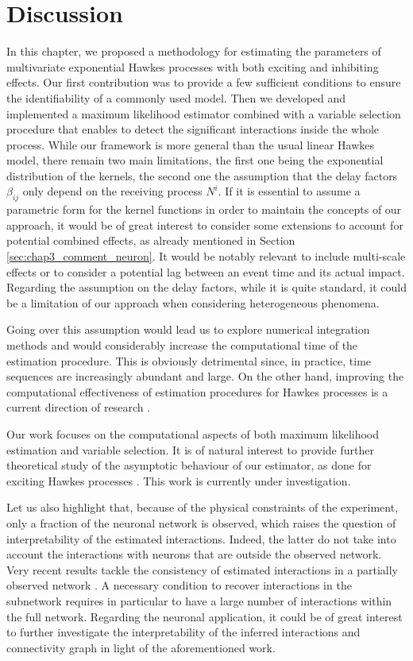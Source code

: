 \section{Discussion}
\label{sec:chap3_discussion}
In this chapter, we proposed a methodology for estimating the parameters of multivariate exponential Hawkes processes with both exciting and inhibiting effects. Our first contribution was to provide a few sufficient conditions to ensure the identifiability of a commonly used model. Then we developed and implemented a maximum likelihood estimator combined with a variable selection procedure that enables to detect the significant interactions inside the whole process.
While our framework is more general than the usual linear Hawkes model, there remain two main limitations, the first one being the exponential distribution of the kernels, the second one the assumption that the delay factors \(\beta_{ij}\)
only depend on the receiving process \(N^i\). If it is essential to assume a parametric form for the kernel functions in order to maintain the concepts of our approach, it would be of great interest to consider some extensions to account for potential combined effects, as already mentioned in Section \ref{sec:chap3_comment_neuron}. It would be notably relevant to include multi-scale effects or to consider a potential lag between an event time and its actual impact.  Regarding the assumption on the delay factors, while it is quite standard, it could be a limitation of our approach when considering heterogeneous phenomena.

Going over this assumption would lead us to explore numerical integration methods and would considerably increase the computational time of the estimation procedure.
This is obviously detrimental since, in practice, time sequences are increasingly abundant and large.
On the other hand, improving the computational effectiveness of estimation procedures for Hawkes processes is a current direction of research \parencite{Bompaire2018bis}.

Our work focuses on the computational aspects of both maximum likelihood estimation and variable selection. It is of natural interest to provide further theoretical study of the asymptotic behaviour of our estimator, as done for exciting Hawkes processes \parencite{Guo2018}.
This work is currently under investigation.

Let us also highlight that, because of the physical constraints of the experiment, only a fraction of the neuronal network is observed, which raises the question of interpretability of the estimated interactions.
Indeed, the latter do not take into account the interactions with neurons that are outside the observed network.
Very recent results tackle the consistency of estimated interactions in a partially observed network \parencite{Reynaud2022}.
A necessary condition to recover interactions in the subnetwork requires in particular to have a large number of interactions within the full network.
Regarding the neuronal application, it could be of great interest to further investigate the interpretability of the inferred interactions and connectivity graph in light of the aforementioned work.


